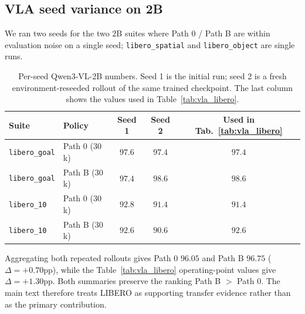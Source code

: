 \documentclass{article}
\begin{document}
\subsection{VLA seed variance on 2B}
\label{app:vla_variance}
We ran two seeds for the two $2$B suites where Path 0 / Path B are within evaluation noise on a single seed; \texttt{libero\_spatial} and \texttt{libero\_object} are single runs.
\begin{table}[h]
\caption{Per-seed Qwen3-VL-2B numbers. Seed 1 is the initial run; seed 2 is a fresh environment-reseeded rollout of the same trained checkpoint. The last column shows the values used in Table~\ref{tab:vla_libero}.}
\label{tab:vla_seed_variance}
\centering\small
\begin{tabular}{llccc}
\toprule
Suite & Policy & Seed 1 & Seed 2 & Used in Tab.~\ref{tab:vla_libero} \\
\midrule
\texttt{libero\_goal} & Path 0 ($30$k) & $97.6$ & $97.4$ & $97.4$ \\
\texttt{libero\_goal} & Path B ($30$k) & $97.4$ & $98.6$ & $98.6$ \\
\texttt{libero\_10}   & Path 0 ($30$k) & $92.8$ & $91.4$ & $91.4$ \\
\texttt{libero\_10}   & Path B ($30$k) & $92.6$ & $90.6$ & $92.6$ \\
\bottomrule
\end{tabular}
\end{table}
Aggregating both repeated rollouts gives Path 0 $96.05$ and Path B $96.75$ ($\Delta{=}+0.70$pp), while the Table~\ref{tab:vla_libero} operating-point values give $\Delta{=}+1.30$pp. Both summaries preserve the ranking Path B $>$ Path 0. The main text therefore treats LIBERO as supporting transfer evidence rather than as the primary contribution.
\end{document}
